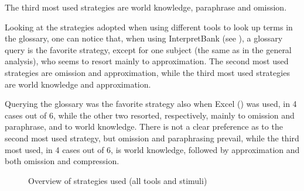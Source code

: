 \documentclass[output=paper]{langsci/langscibook}
\begin{document}
The third most used strategies are world knowledge, paraphrase and omission.

Looking at the strategies adopted when using different tools to look up terms in the glossary, one can notice that, when using InterpretBank (see ), a glossary query is the favorite strategy, except for one subject (the same as in the general analysis), who seems to resort mainly to approximation. The second most used strategies are omission and approximation, while the third most used strategies are world knowledge and approximation.

Querying the glossary was the favorite strategy also when Excel () was used, in 4 cases out of 6, while the other two resorted, respectively, mainly to omission and paraphrase, and to world knowledge. There is not a clear preference as to the second most used strategy, but omission and paraphrasing prevail, while the third most used, in 4 cases out of 6, is world knowledge, followed by approximation and both omission and compression.

\begin{figure}[p]
\caption{Overview of strategies used (all tools and stimuli)
\label{fig:prandi:15}
}
\end{figure}
\end{document}
